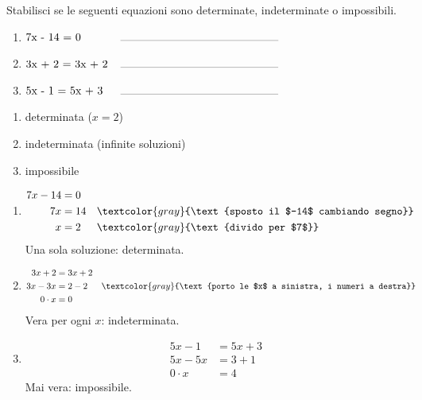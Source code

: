 
\begin{question}[ID=1.2, subtitle={Classificazione di equazioni}, difficulty=facile, tags={equazioni}]
Stabilisci se le seguenti equazioni sono determinate, indeterminate o impossibili.
\begin{enumerate}[leftmargin=3cm]
    \item $\makebox[3cm][l]{7x - 14 = 0}\rule{5cm}{0.2pt}$
    \item $\makebox[3cm][l]{3x + 2 = 3x + 2}\rule{5cm}{0.2pt}$
    \item $\makebox[3cm][l]{5x - 1 = 5x + 3}\rule{5cm}{0.2pt}$
\end{enumerate}
\begin{solution}
\begin{enumerate}
    \item determinata ($x=2$)
    \item indeterminata (infinite soluzioni)
    \item impossibile
\end{enumerate}
\end{solution}
\begin{explanation}
\begin{enumerate}
    \item \[\begin{aligned}
    7x-14 &= 0\\
    7x &= 14 && \textcolor{gray}{\text{sposto il $-14$ cambiando segno}}\\
    x &= 2 && \textcolor{gray}{\text{divido per $7$}}
    \end{aligned}\]
    Una sola soluzione: determinata.
    \item \[\begin{aligned}
    3x+2 &= 3x+2\\
    3x-3x &= 2-2 && \textcolor{gray}{\text{porto le $x$ a sinistra, i numeri a destra}}\\
    0\cdot x &= 0
    \end{aligned}\]
    Vera per ogni $x$: indeterminata.
    \item \[\begin{aligned}
    5x-1 &= 5x+3\\
    5x-5x &= 3+1\\
    0\cdot x &= 4
    \end{aligned}\]
    Mai vera: impossibile.
\end{enumerate}
\end{explanation}
\end{question}

